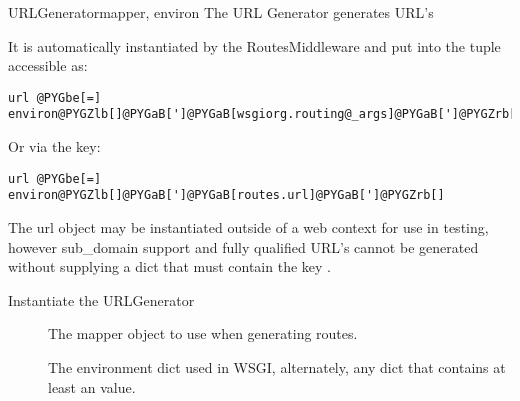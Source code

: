 \documentclass[letterpaper,10pt,english]{manual}
\begin{document}
\hypertarget{routes.URLGenerator}{}\begin{classdesc}{URLGenerator}{mapper, environ}
The URL Generator generates URL's

It is automatically instantiated by the RoutesMiddleware and put
into the  tuple accessible as:

\begin{Verbatim}[commandchars=@\[\]]
url @PYGbe[=] environ@PYGZlb[]@PYGaB[']@PYGaB[wsgiorg.routing@_args]@PYGaB[']@PYGZrb[]@PYGZlb[]@PYGaw[0]@PYGZrb[]@PYGZlb[]@PYGaw[0]@PYGZrb[]
\end{Verbatim}

Or via the  key:

\begin{Verbatim}[commandchars=@\[\]]
url @PYGbe[=] environ@PYGZlb[]@PYGaB[']@PYGaB[routes.url]@PYGaB[']@PYGZrb[]
\end{Verbatim}

The url object may be instantiated outside of a web context for use
in testing, however sub\_domain support and fully qualified URL's
cannot be generated without supplying a dict that must contain the
key .

Instantiate the URLGenerator
\begin{description}
\item[]
The mapper object to use when generating routes.

\item[]
The environment dict used in WSGI, alternately, any dict
that contains at least an  value.

\end{description}
\end{classdesc}
\end{document}

